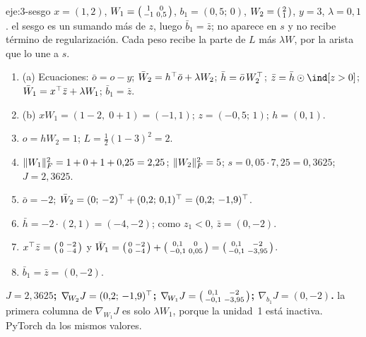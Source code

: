 \begin{solucion}{eje:3-sesgo}
\datos $x=(1,2)$, $W_1=\begin{psmallmatrix}1&0\\-1&0{,}5\end{psmallmatrix}$, $b_1=(0{,}5;\,0)$, $W_2=\begin{psmallmatrix}2\\1\end{psmallmatrix}$, $y=3$, $\lambda=0{,}1$.
\planteamiento el sesgo es un sumando más de $z$, luego $\bar b_1=\bar z$; no aparece en $s$ y no recibe término de regularización. Cada peso recibe la parte de $L$ más $\lambda W$, por la arista que lo une a $s$.
\pasos
\begin{enumerate}[label=\arabic*.]
  \item (a) Ecuaciones: $\bar o=o-y$; $\bar W_2=h^{\top}\bar o+\lambda W_2$; $\bar h=\bar o\,W_2^{\top}$; $\bar z=\bar h\odot\ind[z>0]$; $\bar W_1=x^{\top}\bar z+\lambda W_1$; $\bar b_1=\bar z$.
  \item (b) $xW_1=(1-2,\;0+1)=(-1,1)$; $z=(-0{,}5;\,1)$; $h=(0,1)$.
  \item $o=hW_2=1$; $L=\tfrac12(1-3)^{2}=2$.
  \item $\lVert W_1\rVert_F^{2}=1+0+1+0{,}25=2{,}25$; $\lVert W_2\rVert_F^{2}=5$; $s=0{,}05\cdot 7{,}25=0{,}3625$; $J=2{,}3625$.
  \item $\bar o=-2$; $\bar W_2=(0;\,-2)^{\top}+(0{,}2;\,0{,}1)^{\top}=(0{,}2;\,-1{,}9)^{\top}$.
  \item $\bar h=-2\cdot(2,1)=(-4,-2)$; como $z_1<0$, $\bar z=(0,-2)$.
  \item $x^{\top}\bar z=\begin{psmallmatrix}0&-2\\0&-4\end{psmallmatrix}$ y $\bar W_1=\begin{psmallmatrix}0&-2\\0&-4\end{psmallmatrix}+\begin{psmallmatrix}0{,}1&0\\-0{,}1&0{,}05\end{psmallmatrix}=\begin{psmallmatrix}0{,}1&-2\\-0{,}1&-3{,}95\end{psmallmatrix}$.
  \item $\bar b_1=\bar z=(0,-2)$.
\end{enumerate}
\resultado \textbf{$J=2{,}3625$; $\nabla_{\!W_2}J=(0{,}2;\,-1{,}9)^{\top}$; $\nabla_{\!W_1}J=\begin{psmallmatrix}0{,}1&-2\\-0{,}1&-3{,}95\end{psmallmatrix}$; $\nabla_{\!b_1}J=(0,-2)$.}
\comprobacion la primera columna de $\nabla_{\!W_1}J$ es solo $\lambda W_1$, porque la unidad~1 está inactiva. PyTorch da los mismos valores.
\end{solucion}

